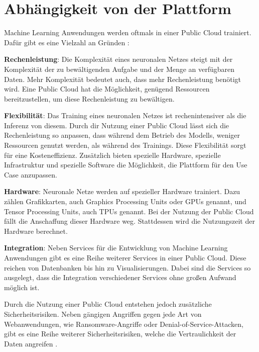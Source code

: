 \section{Abhängigkeit von der Plattform}\label{sec:plattform}

Machine Learning Anwendungen werden oftmals in einer Public Cloud trainiert.
Dafür gibt es eine Vielzahl an Gründen \cite{neumann}:
\begin{compactitem}
    \item \textbf{Rechenleistung}: Die Komplexität eines neuronalen Netzes steigt mit der Komplexität der zu bewältigenden Aufgabe und der Menge an verfügbaren Daten. 
    Mehr Komplexität bedeutet auch, dass mehr Rechenleistung benötigt wird. 
    Eine Public Cloud hat die Möglichkeit, genügend Ressourcen bereitzustellen, um diese Rechenleistung zu bewältigen.
    \item \textbf{Flexibilität}: Das Training eines neuronalen Netzes ist rechenintensiver als die Inferenz von diesem. 
    Durch dir Nutzung einer Public Cloud lässt sich die Rechenleistung so anpassen, dass während dem Betrieb des Modells, weniger Ressourcen genutzt werden, als während des Trainings. 
    Diese Flexibilität sorgt für eine Kosteneffizienz.
    Zusätzlich bieten spezielle Hardware, spezielle Infrastruktur und spezielle Software die Möglichkeit, die Plattform für den Use Case anzupassen.
    \item \textbf{Hardware}: Neuronale Netze werden auf spezieller Hardware trainiert.
    Dazu zählen Grafikkarten, auch Graphics Processing Units oder GPUs genannt, und Tensor Processing Units, auch TPUs genannt.
    Bei der Nutzung der Public Cloud fällt die Anschaffung dieser Hardware weg.
    Stattdessen wird die Nutzungszeit der Hardware berechnet.
    \item \textbf{Integration}: Neben Services für die Entwicklung von Machine Learning Anwendungen gibt es eine Reihe weiterer Services in einer Public Cloud. 
    Diese reichen von Datenbanken bis hin zu Visualisierungen.
    Dabei sind die Services so ausgelegt, dass die Integration verschiedener Services ohne großen Aufwand möglich ist.
\end{compactitem}

Durch die Nutzung einer Public Cloud entstehen jedoch zusätzliche Sicherheitsrisiken.
\mbox{Neben} gängigen Angriffen gegen jede Art von Webanwendungen, wie Ransomware-Angriffe oder Denial-of-Service-Attacken, gibt es eine Reihe weiterer Sicherheitsrisiken, welche die Vertraulichkeit der Daten angreifen \cite{neumann}.

